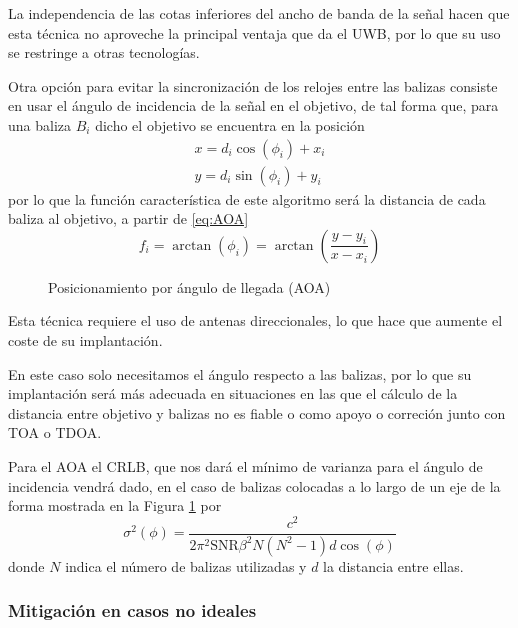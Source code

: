 La independencia de las cotas inferiores del ancho de banda de la señal hacen que esta técnica no aproveche la principal ventaja que da el UWB, por lo que su uso se restringe a otras tecnologías.


Otra opción para evitar la sincronización de los relojes entre las balizas consiste en usar el ángulo de incidencia de la señal en el objetivo, de tal forma que, para una baliza $B_i$ dicho el objetivo se encuentra en la posición
\begin{equation}
    \label{eq:AOA}
    \begin{aligned}
        x = d_i \cos(\phi_i) + x_i \\        
        y = d_i \sin(\phi_i) + y_i         
    \end{aligned}
\end{equation}
por lo que la función característica de este algoritmo será la distancia de cada baliza al objetivo, a partir de \eqref{eq:AOA}
\begin{equation}
    f_i = \arctan(\phi_i) = \arctan(\frac{y-y_i}{x-x_i})
\end{equation}

\begin{figure}[H]
    \centering
    \def\svgwidth{0.6\linewidth}
	
    \caption{Posicionamiento por ángulo de llegada (AOA)}
    \label{fig:AOA}
\end{figure}
Esta técnica requiere el uso de antenas direccionales, lo que hace que aumente el coste de su implantación.

En este caso solo necesitamos el ángulo respecto a las balizas, por lo que su implantación será más adecuada en situaciones en las que el cálculo de la distancia entre objetivo y balizas no es fiable o como apoyo o correción junto con TOA o TDOA.

Para el AOA el CRLB, que nos dará el mínimo de varianza para el ángulo de incidencia vendrá dado, en el caso de balizas colocadas a lo largo de un eje de la forma mostrada en la Figura \ref{fig:AOA} por \cite{Xbook, shim2018}
\begin{equation}
    \sigma^2(\phi) = \frac{c^2}{2\pi^2 \text{SNR} \beta^2 N(N^2-1)d\cos(\phi)}
\end{equation}
donde $N$ indica el número de balizas utilizadas y $d$ la distancia entre ellas.

\subsubsection{Mitigación en casos no ideales}

